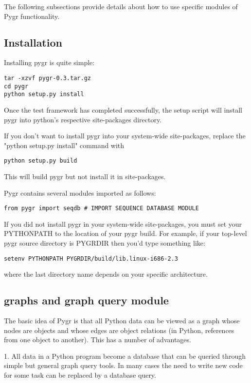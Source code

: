 \documentclass{howto}
\begin{document}
The following subsections provide details about how to use specific
modules of Pygr functionality. 

\subsection{Installation}
\label{install}
Installing pygr is quite simple:
\begin{verbatim}
tar -xzvf pygr-0.3.tar.gz 
cd pygr
python setup.py install 
\end{verbatim}

Once the test framework has completed successfully, the setup script
will install pygr into python's respective site-packages directory. 

If you don't want to install pygr into your system-wide site-packages,
replace the "python setup.py install" command with
\begin{verbatim}
python setup.py build
\end{verbatim}
This will build pygr but not install it in site-packages.

Pygr contains several modules imported as follows:
\begin{verbatim}
from pygr import seqdb # IMPORT SEQUENCE DATABASE MODULE
\end{verbatim}

If you did not install pygr in your system-wide site-packages, you 
must set your PYTHONPATH to the location of your pygr build.
For example, if your top-level pygr source directory is PYGRDIR then
you'd type something like:
\begin{verbatim}
setenv PYTHONPATH PYGRDIR/build/lib.linux-i686-2.3
\end{verbatim}
where the last directory name depends on your specific architecture.

\subsection{graphs and graph query module}
\label{graphs-query}

The basic idea of Pygr is that all Python data can be viewed as a graph whose nodes are objects and whose edges are object relations (in Python, references from one object to another).  This has a number of advantages. 

   1. All data in a Python program become a database  that can be queried through simple but general graph query tools.  In many cases the need to write new code for some task can be replaced by a database query. 
\end{document}
